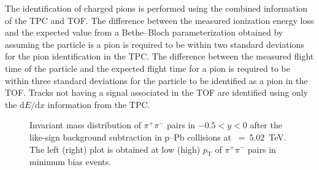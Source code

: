 The identification of charged pions is performed using the combined information of the TPC and TOF. The difference between the measured ionization energy loss and the expected value from a Bethe--Bloch parameterization obtained by assuming the particle is a pion is required to be within two standard deviations for the pion identification in the TPC. The difference between the measured flight time of the particle and the expected flight time for a pion is required to be within three standard deviations for the particle to be identified as a pion in the TOF. Tracks not having a signal associated in the TOF are identified using only the $\mathrm{d}E/\mathrm{d}x$ information from the TPC.

\label{sec:ana}
\begin{figure}[hbt!]
	\centering
	\caption{ Invariant mass distribution of $\pi^{+}\pi^{-}$ pairs in $-0.5<y<0$ after the like-sign background subtraction in p--Pb collisions at \snn~=~5.02~TeV. The left (right) plot is obtained at low (high) $p_{\mathrm{T}}$ of $\pi^{+}\pi^{-}$ pairs in minimum bias events. }
	\label{fig:SigExt}
\end{figure}


